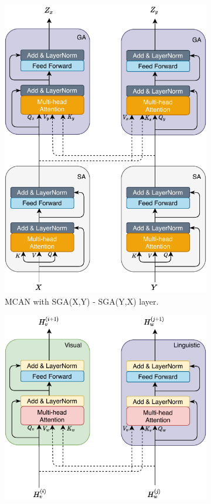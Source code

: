\documentclass{article}
\begin{document}
\begin{figure}[ht]
	\centering
	\begin{subfigure}[b]{\textwidth}
	\centering
	\includegraphics[scale=0.7]{attention}
	\caption{MCAN with SGA(X,Y) - SGA(Y,X) layer.}
	\end{subfigure}
	\begin{subfigure}[b]{\textwidth}
	\centering
	\includegraphics[scale=0.7]{vilbert_coattention}

\end{subfigure}
\end{figure}
\end{document}
